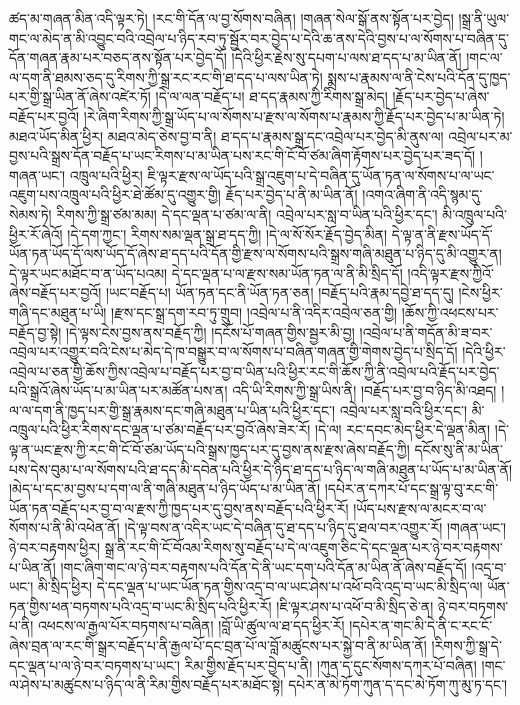 ཚད་མ་གཞན་མིན་འདི་ལྟར་ཏེ། །རང་གི་དོན་ལ་བྱ་སོགས་བཞིན། །གཞན་སེལ་སྒོ་ནས་སྟོན་པར་བྱེད། །སྒྲ་ནི་ཡུལ་གང་ལ་མེད་ན་མི་འབྱུང་བའི་འབྲེལ་པ་ཉིད་རབ་ཏུ་སྦྱོར་བར་བྱེད་པ་དེའི་ཆ་ནས་དེའི་བྱས་པ་ལ་སོགས་པ་བཞིན་དུ་དོན་གཞན་རྣམ་པར་བཅད་ནས་སྟོན་པར་བྱེད་དོ། །དེའི་ཕྱིར་རྗེས་སུ་དཔག་པ་ལས་ཐ་དད་པ་མ་ཡིན་ནོ། །གང་ལ་ལ་དག་ནི་ཐམས་ཅད་དུ་རིགས་ཀྱི་སྒྲ་རང་རང་གི་ཐ་དད་པ་ལས་ཡིན་ཏེ། སྨྲས་པ་རྣམས་ལ་ནི་ངེས་པའི་དོན་དུ་ཁྱད་པར་གྱི་སྒྲ་ཡིན་ནོ་ཞེས་འཛེར་ཏོ། །དེ་ལ་ལན་བརྗོད་པ། ཐ་དད་རྣམས་ཀྱི་རིགས་སྒྲ་མེད། །རྗོད་པར་བྱེད་པ་ཞེས་བརྗོད་པར་བྱའོ། །རེ་ཞིག་རིགས་ཀྱི་སྒྲ་ཡོད་པ་ལ་སོགས་པ་རྫས་ལ་སོགས་པ་རྣམས་ཀྱི་རྗོད་པར་བྱེད་པ་མ་ཡིན་ཏེ། མཐའ་ཡོད་མིན་ཕྱིར། མཐའ་མེད་ཅེས་བྱ་བ་ནི། ཐ་དད་པ་རྣམས་སྒྲ་དང་འབྲེལ་པར་བྱེད་མི་ནུས་ལ། འབྲེལ་པར་མ་བྱས་པའི་སྒྲས་དོན་བརྗོད་པ་ཡང་རིགས་པ་མ་ཡིན་པས་རང་གི་ངོ་བོ་ཙམ་ཞིག་རྟོགས་པར་བྱེད་པར་ཟད་དོ། །གཞན་ཡང་། འཁྲུལ་པའི་ཕྱིར། ཇི་ལྟར་རྫས་ལ་ཡོད་པའི་སྒྲ་འཇུག་པ་དེ་བཞིན་དུ་ཡོན་ཏན་ལ་སོགས་པ་ལ་ཡང་འཇུག་པས་འཁྲུལ་པའི་ཕྱིར་ཐེ་ཚོམ་དུ་འགྱུར་གྱི། རྗོད་པར་བྱེད་པ་ནི་མ་ཡིན་ནོ། །འགའ་ཞིག་ནི་འདི་སྙམ་དུ་སེམས་ཏེ། རིགས་ཀྱི་སྒྲ་ཙམ་མམ། དེ་དང་ལྡན་པ་ཙམ་ལ་ནི། འབྲེལ་པར་སླ་བ་ཡིན་པའི་ཕྱིར་དང་། མི་འཁྲུལ་པའི་ཕྱིར་རོ་ཞེའོ། །དེ་དག་ཀྱང་། རིགས་སམ་ལྡན་སྒྲ་ཐ་དད་ཀྱི། །དེ་ལ་སོ་སོར་རྗོད་བྱེད་མིན། དེ་ལྟ་ན་ནི་རྫས་ཡོད་དོ་ཡོན་ཏན་ཡོད་དོ་ལས་ཡོད་དོ་ཞེས་ཐ་དད་པའི་དོན་གྱི་རྫས་ལ་སོགས་པའི་སྒྲས་གཞི་མཐུན་པ་ཉིད་དུ་མི་འགྱུར་ན། དེ་ལྟར་ཡང་མཐོང་བ་ན་ཡོད་པའམ། དེ་དང་ལྡན་པ་ལ་རྫས་སམ་ཡོན་ཏན་ལ་ནི་མི་སྲིད་དོ། །འདི་ལྟར་རྫས་ཀྱིའོ་ཞེས་བརྗོད་པར་བྱའོ། །ཡང་བརྗོད་པ། ཡོན་ཏན་དང་ནི་ཡོན་ཏན་ཅན། །བརྗོད་པའི་རྣམ་དབྱེ་ཐ་དད་དུ། །ངེས་ཕྱིར་གཞི་དང་མཐུན་པ་ཡི། །རྫས་དང་སྒྲ་དག་རབ་ཏུ་གྲུབ། །འབྲེལ་པ་ནི་འདིར་འབྲེལ་ཅན་གྱི། །ཆོས་ཀྱི་འཕངས་པར་བརྗོད་བྱ་སྟེ། །དེ་ལྟས་ངེས་བྱས་ནས་བརྗོད་ཀྱི། །དངོས་པོ་གཞན་གྱིས་སྦྱར་མི་བྱ། །འབྲེལ་པ་ནི་གདོན་མི་ཟ་བར་འབྲེལ་པར་འགྱུར་བའི་ངེས་པ་མེད་དེ་ཁ་བསྒྱུར་བ་ལ་སོགས་པ་བཞིན་གཞན་གྱི་གེགས་བྱེད་པ་སྲིད་དོ། །དེའི་ཕྱིར་འབྲེལ་པ་ཅན་གྱི་ཆོས་ཀྱིས་འབྲེལ་པ་བརྗོད་པར་བྱ་བ་ཡིན་པའི་ཕྱིར་རང་གི་ཆོས་ཀྱི་ནི་འབྲེལ་པའི་རྗོད་པར་བྱེད་པའི་སྒྲའོ་ཞེས་ཡོད་པ་མ་ཡིན་པར་མཚོན་པས་ན། འདི་ཡི་རིགས་ཀྱི་སྒྲ་ཡིས་ནི། །བརྗོད་པར་བྱ་བ་ཉིད་མི་འཐད། །ལ་ལ་དག་ནི་ཁྱད་པར་གྱི་སྒྲ་རྣམས་དང་གཞི་མཐུན་པ་ཡིན་པའི་ཕྱིར་དང་། འབྲེལ་པར་སླ་བའི་ཕྱིར་དང་། མི་འཁྲུལ་པའི་ཕྱིར་རིགས་དང་ལྡན་པ་ཙམ་བརྗོད་པར་བྱའོ་ཞེས་ཟེར་རོ། །དེ་ལ། རང་དབང་མེད་ཕྱིར་དེ་ལྡན་མིན། །དེ་ལྟ་ན་ཡང་རྫས་ཀྱི་རང་གི་ངོ་བོ་ཙམ་ཡོད་པའི་སྒྲས་ཁྱད་པར་དུ་བྱས་ནས་རྫས་ཞེས་བརྗོད་ཀྱི། དངོས་སུ་ནི་མ་ཡིན་པས་དེས་བུམ་པ་ལ་སོགས་པའི་ཐ་དད་མི་དབེན་པའི་ཕྱིར་དེ་ཉིད་ཐ་དད་པ་ཉིད་ལ་གཞི་མཐུན་པ་ཡོད་པ་མ་ཡིན་ནོ། །མེད་པ་དང་མ་བྱས་པ་དག་ལ་ནི་གཞི་མཐུན་པ་ཉིད་ཡོད་པ་མ་ཡིན་ནོ། །དཔེར་ན་དཀར་པོ་དང་སྒྲ་ལྟ་བུ་རང་གི་ཡོན་ཏན་བརྗོད་པར་བྱ་བ་ལ་རྫས་ཀྱི་ཁྱད་པར་དུ་བྱས་ནས་བརྗོད་པའི་ཕྱིར་རོ། །ཡོད་པས་རྫས་ལ་མངར་བ་ལ་སོགས་པ་ནི་མི་འཕེན་ནོ། །དེ་ལྟ་བས་ན་འདིར་ཡང་དེ་བཞིན་དུ་ཐ་དད་པ་ཉིད་དུ་ཐལ་བར་འགྱུར་རོ། །གཞན་ཡང་། ཉེ་བར་བརྟགས་ཕྱིར། སྒྲ་ནི་རང་གི་ངོ་བོའམ་རིགས་སུ་བརྗོད་པ་དེ་ལ་འཇུག་ཅིང་དེ་དང་ལྡན་པར་ཉེ་བར་བརྟགས་པ་ཡིན་ནོ། །གང་ཞིག་གང་ལ་ཉེ་བར་བརྟགས་པའི་དོན་དེ་ནི་ཡང་དག་པའི་དོན་མ་ཡིན་ནོ་ཞེས་བརྗོད་དོ། །འདྲ་བ་ཡང་། མི་སྲིད་ཕྱིར། དེ་དང་ལྡན་པ་ཡང་ཡོན་ཏན་གྱིས་འདྲ་བ་ལ་ཡང་ཤེས་པ་འཕོ་བའི་འདྲ་བ་ཡང་མི་སྲིད་ལ། ཡོན་ཏན་གྱིས་ཕན་བཏགས་པའི་འདྲ་བ་ཡང་མི་སྲིད་པའི་ཕྱིར་རོ། །ཇི་ལྟར་ཤས་པ་འཕོ་བ་མི་སྲིད་ཅེ་ན། ཉེ་བར་བཏགས་པ་ནི། འཕངས་ལ་རྒྱལ་པོར་བཏགས་པ་བཞིན། །བློ་ཡི་ཚུལ་ལ་ཐ་དད་ཕྱིར་རོ། །དཔེར་ན་གང་མི་དེ་ནི་ང་རང་ངོ་ཞེས་བྲན་ལ་རང་གི་སྒྲར་བརྗོད་པ་ནི་རྒྱལ་པོ་དང་བྲན་པོ་ལ་བློ་མཚུངས་པར་སྐྱེ་བ་ནི་མ་ཡིན་ནོ། །རིགས་ཀྱི་སྒྲ་དེ་དང་ལྡན་པ་ལ་ཉེ་བར་བཏགས་པ་ཡང་། རིམ་གྱིས་རྗོད་པར་བྱེད་པ་ནི། །ཀུན་ད་དུང་སོགས་དཀར་པོ་བཞིན། །གང་ལ་ཤེས་པ་མཚུངས་པ་ཉིད་ལ་ནི་རིམ་གྱིས་བརྗོད་པར་མཐོང་སྟེ། དཔེར་ན་མེ་ཏོག་ཀུན་ད་དང་མེ་ཏོག་ཀུ་མུ་ཏ་དང་། 